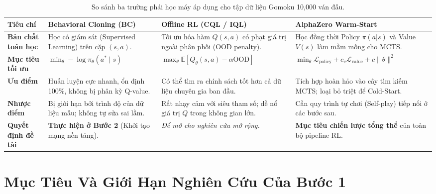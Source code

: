 \documentclass[11pt,a4paper]{report}
\begin{document}
\begin{table}[htbp]
\centering
\caption{So sánh ba trường phái học máy áp dụng cho tập dữ liệu Gomoku 10,000 ván đấu.}
\label{tab:three_paradigms}
\small
\begin{tabularx}{\textwidth}{p{2.8cm} p{3.8cm} p{3.8cm} X}
\toprule
\textbf{Tiêu chí} & \textbf{Behavioral Cloning (BC)} & \textbf{Offline RL (CQL / IQL)} & \textbf{AlphaZero Warm-Start} \\
\midrule
\textbf{Bản chất toán học} & Học có giám sát (Supervised Learning) trên cặp $(s, a)$. & Tối ưu hóa hàm $Q(s, a)$ có phạt giá trị ngoài phân phối (OOD penalty). & Học đồng thời Policy $\pi(a|s)$ và Value $V(s)$ làm mầm mống cho MCTS. \\
\addlinespace
\textbf{Mục tiêu tối ưu} & $\min_\theta -\log \pi_\theta(a^* \mid s)$ & $\max_\theta \mathbb{E}[Q_\theta(s, a) - \alpha \text{OOD}]$ & $\min_\theta \mathcal{L}_{\text{policy}} + c_v \mathcal{L}_{\text{value}} + c \|\theta\|^2$ \\
\addlinespace
\textbf{Ưu điểm} & Huấn luyện cực nhanh, ổn định 100\%, không bị phân kỳ Q-value. & Có thể tìm ra chính sách tốt hơn cả dữ liệu chuyên gia ban đầu. & Tích hợp hoàn hảo vào cây tìm kiếm MCTS; loại bỏ triệt để Cold-Start. \\
\addlinespace
\textbf{Nhược điểm} & Bị giới hạn bởi trình độ của dữ liệu mẫu; không tự sửa sai lầm. & Rất nhạy cảm với siêu tham số; dễ nổ giá trị $Q$ trong không gian lớn. & Cần quy trình tự chơi (Self-play) tiếp nối ở các bước sau. \\
\addlinespace
\textbf{Quyết định đề tài} & \textbf{Thực hiện ở Bước 2} (Khởi tạo mạng nền tảng). & \textit{Để mở cho nghiên cứu mở rộng.} & \textbf{Mục tiêu chiến lược tổng thể} của toàn bộ pipeline RL. \\
\bottomrule
\end{tabularx}
\end{table}

\section{Mục Tiêu Và Giới Hạn Nghiên Cứu Của Bước 1}
\end{document}
